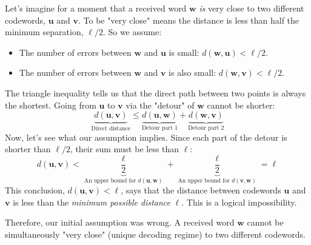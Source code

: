 \documentclass{article}
\begin{document}
Let's imagine for a moment that a received word $\mathbf{w}$ \textit{is} very close to two different codewords, $\mathbf{u}$ and $\mathbf{v}$. To be "very close" means the distance is less than half the minimum separation, $\ell/2$. So we assume:
\begin{itemize}
    \item The number of errors between $\mathbf{w}$ and $\mathbf{u}$ is small: $d(\mathbf{w}, \mathbf{u}) < \ell/2$.
    \item The number of errors between $\mathbf{w}$ and $\mathbf{v}$ is also small: $d(\mathbf{w}, \mathbf{v}) < \ell/2$.
\end{itemize}
The triangle inequality tells us that the direct path between two points is always the shortest. Going from $\mathbf{u}$ to $\mathbf{v}$ via the "detour" of $\mathbf{w}$ cannot be shorter:
\[
\underbrace{d(\mathbf{u}, \mathbf{v})}_{\text{Direct distance}} \leq \underbrace{d(\mathbf{u}, \mathbf{w})}_{\text{Detour part 1}} + \underbrace{d(\mathbf{w}, \mathbf{v})}_{\text{Detour part 2}}
\]
Now, let's see what our assumption implies. Since each part of the detour is shorter than $\ell/2$, their sum must be less than $\ell$:
\[
d(\mathbf{u}, \mathbf{v}) < \underbrace{\frac{\ell}{2}}_{\text{An upper bound for } d(\mathbf{u},\mathbf{w})} + \underbrace{\frac{\ell}{2}}_{\text{An upper bound for } d(\mathbf{v},\mathbf{w})} = \ell
\]
This conclusion, $d(\mathbf{u}, \mathbf{v}) < \ell$, says that the distance between codewords $\mathbf{u}$ and $\mathbf{v}$ is less than the \textit{minimum possible distance} $\ell$. This is a logical impossibility.

Therefore, our initial assumption was wrong. A received word $\mathbf{w}$ cannot be simultaneously "very close" (unique decoding regime) to two different codewords.
\end{document}
